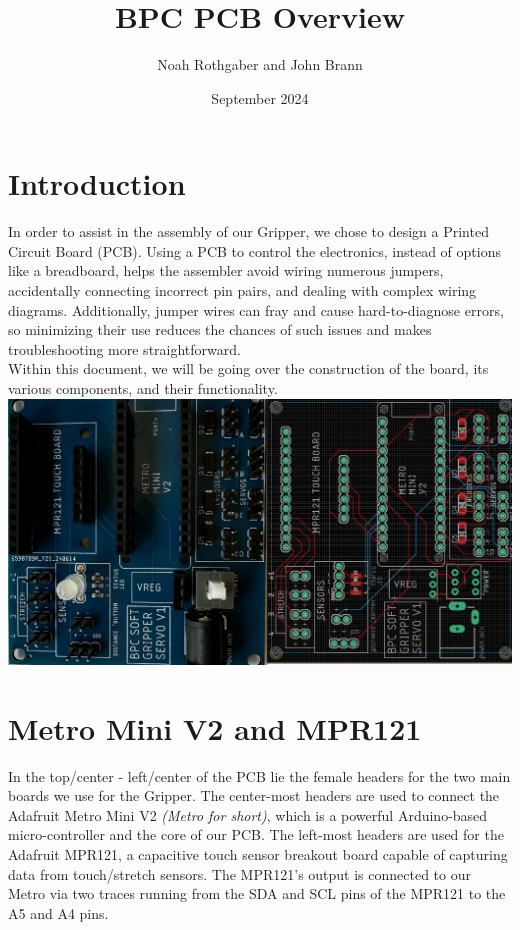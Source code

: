 \documentclass{article}
\title{BPC PCB Overview}
\author{Noah Rothgaber and John Brann}
\date{September 2024}
\begin{document}
\maketitle
\section{Introduction}

In order to assist in the assembly of our Gripper, we chose to design a Printed Circuit Board (PCB). Using a PCB to control the electronics, instead of options like a breadboard, helps the assembler avoid wiring numerous jumpers, accidentally connecting incorrect pin pairs, and dealing with complex wiring diagrams. Additionally, jumper wires can fray and cause hard-to-diagnose errors, so minimizing their use reduces the chances of such issues and makes troubleshooting more straightforward.\\

Within this document, we will be going over the construction of the board, its various components, and their functionality.\\

\includegraphics[]{Images/Combined.png}
\section{Metro Mini V2 and MPR121}
In the top/center - left/center of the PCB lie the female headers for the two main boards we use for the Gripper. The center-most headers are used to connect the Adafruit Metro Mini V2  \textit{(Metro for short)}, which is a powerful Arduino-based micro-controller and the core of our PCB. The left-most headers are used for the Adafruit MPR121, a capacitive touch sensor breakout board capable of capturing data from touch/stretch sensors. The MPR121's output is connected to our Metro via two traces running from the SDA and SCL pins of the MPR121 to the A5 and A4 pins.\\
\end{document}
